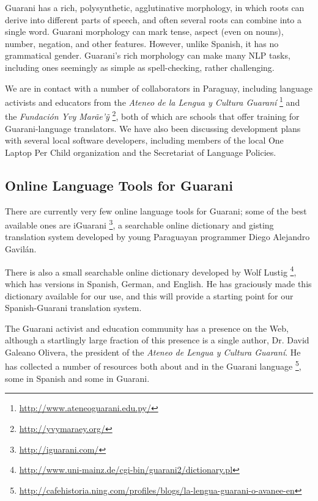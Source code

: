 Guarani has a rich, polysynthetic, agglutinative morphology, in which roots can
derive into different parts of speech, and often several roots can combine into
a single word. Guarani morphology can mark tense, aspect (even on nouns),
number, negation, and other features. However, unlike Spanish, it has no
grammatical gender.  Guarani's rich morphology can make many NLP tasks,
including ones seemingly as simple as spell-checking, rather challenging.

We are in contact with a number of collaborators in Paraguay, including
language activists and educators from the \emph{Ateneo de la Lengua y Cultura
Guaraní} \footnote{\url{http://www.ateneoguarani.edu.py/}} and the
\emph{Fundación Yvy Marãe'{\~y}} \footnote{\url{http://yvymaraey.org/}},
both of which are schools that offer training for Guarani-language translators.
We have also been discussing development plans with several local software
developers, including members of the local One Laptop Per Child organization
and the Secretariat of Language Policies.

\subsection{Online Language Tools for Guarani}
There are currently very few online language tools for Guarani; some of the
best available ones are iGuarani \footnote{\url{http://iguarani.com/}}, a
searchable online dictionary and gisting translation system developed by young
Paraguayan programmer Diego Alejandro Gavilán.

There is also a small searchable online dictionary developed by Wolf Lustig
\footnote{\url{http://www.uni-mainz.de/cgi-bin/guarani2/dictionary.pl}},
which has versions in Spanish, German, and English. He has graciously made this
dictionary available for our use, and this will provide a starting point for
our Spanish-Guarani translation system.

The Guarani activist and education community has a presence on the Web,
although a startlingly large fraction of this presence is a single author,
Dr. David Galeano Olivera, the president of the \emph{Ateneo de Lengua y
Cultura Guaraní}. He has collected a number of resources both about and in the
Guarani language
\footnote{\url{http://cafehistoria.ning.com/profiles/blogs/la-lengua-guarani-o-avanee-en}},
some in Spanish and some in Guarani.
